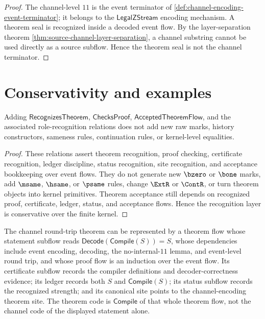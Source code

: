 \begin{proof}
The channel-level $11$ is the event terminator of \autoref{def:channel-encoding-event-terminator}; it belongs to the $\mathsf{LegalZStream}$ encoding mechanism. A theorem seal is recognized inside a decoded event flow. By the layer-separation theorem \autoref{thm:source-channel-layer-separation}, a channel substring cannot be used directly as a source subflow. Hence the theorem seal is not the channel terminator.
\end{proof}

\section{Conservativity and examples}
\label{sec:theorem-generated-conservativity-examples}

\begin{theorem}
\label{thm:theorem-generated-conservativity}
Adding $\mathsf{RecognizesTheorem}$, $\mathsf{ChecksProof}$, $\mathsf{AcceptedTheoremFlow}$, and the associated role-recognition relations does not add new raw marks, history constructors, sameness rules, continuation rules, or kernel-level equalities.
\end{theorem}

\begin{proof}
These relations assert theorem recognition, proof checking, certificate recognition, ledger discipline, status recognition, site recognition, and acceptance bookkeeping over event flows. They do not generate new $\bzero$ or $\bone$ marks, add $\msame$, $\hsame$, or $\psame$ rules, change $\ExtR$ or $\ContR$, or turn theorem objects into kernel primitives. Theorem acceptance still depends on recognized proof, certificate, ledger, status, and acceptance flows. Hence the recognition layer is conservative over the finite kernel.
\end{proof}

\begin{example}
\label{ex:theorem-generated-channel-round-trip-flow}
The channel round-trip theorem can be represented by a theorem flow whose statement subflow reads $\mathsf{Decode}(\mathsf{Compile}(S))=S$, whose dependencies include event encoding, decoding, the no-internal-$11$ lemma, and event-level round trip, and whose proof flow is an induction over the event flow. Its certificate subflow records the compiler definitions and decoder-correctness evidence; its ledger records both $S$ and $\mathsf{Compile}(S)$; its status subflow records the recognized strength; and its canonical site points to the channel-encoding theorem site. The theorem code is $\mathsf{Compile}$ of that whole theorem flow, not the channel code of the displayed statement alone.
\end{example}

